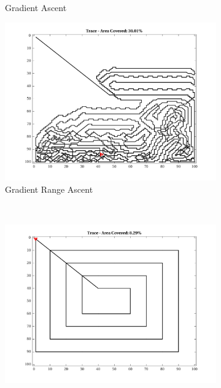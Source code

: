 \begin{figure}[htb!]
\begin{subfigure}[t]{0.3333\textwidth}
        \captionsetup{skip=0.20\baselineskip,size=footnotesize}
        \caption{Gradient Ascent}
    \end{subfigure}%
    \begin{subfigure}[t]{0.3333\textwidth}
        \centering
        \includegraphics[width=\linewidth]{figures/hbresults/path_gr_30p_100x100_sf_1_seed_2.png}
        \captionsetup{skip=0.20\baselineskip,size=footnotesize}
        \caption{Gradient Range Ascent}
    \end{subfigure}%
    \\
    \begin{subfigure}[t]{0.3333\textwidth}
        \centering
        \includegraphics[width=\linewidth]{figures/hbresults/path_zz_10p_100x100_sf_1_seed_2.png}

\end{subfigure}
\end{figure}
